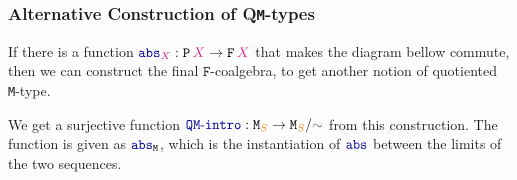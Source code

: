 \documentclass[xelatex,mathserif,serif,notheorems]{beamer} %
\theoremstyle{plain} %
\theoremstyle{definition}
\theoremstyle{remark}
\newcommand*{\type}[1]{\textcolor{magenta!90!black}{#1}}
\newcommand*{\container}[1]{\textcolor{orange}{#1}}
\newcommand*{\relation}[1]{\textcolor{gray!75!black}{\ensuremath{\mathtt{#1}}}}
\newcommand*{\function}[1]{\textcolor{blue!60!black}{\ensuremath{\mathtt{#1}}}}
\newcommand*{\typeformer}[1]{\ensuremath{\mathtt{#1}}}
\newcommand*{\functor}[1]{\ensuremath{\mathbf{\mathtt{#1}}}}
\begin{document}
\begin{frame}[fragile]
  \frametitle{Alternative Construction of Q\texttt{M}-types}
  If there is a function \(\function{abs}_{\type{X}} : \functor{P}\,\type{X} \rightarrow \functor{F}\,\type{X}\) that makes the diagram bellow commute, then we can construct the final \(\functor{F}\)-coalgebra, to get another notion of quotiented \texttt{M}-type.
  \begin{figure}[h]
    \centering
  \end{figure}
  We get a surjective function \(\function{QM\text{-}intro} : \typeformer{M}_{\container{S}} \rightarrow \typeformer{M}_{\container{S}} / \relation{\sim}\) from this construction. The function is given as \(\function{abs}_{\typeformer{M}}\), which is the instantiation of \(\function{abs}\) between the limits of the two sequences. 
\end{frame}
\end{document}

